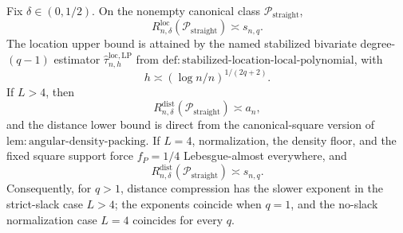 Fix \(\delta\in(0,1/2)\).  On the nonempty canonical class \(\mathcal P_{\mathrm{straight}}\),
\[
 R_{n,\delta}^{\mathrm{loc}}(\mathcal P_{\mathrm{straight}})\asymp s_{n,q}.
\]
The location upper bound is attained by the named stabilized bivariate degree-\((q-1)\) estimator \(\widehat\tau^{\mathrm{loc},\mathrm{LP}}_{n,h}\) from \(\mathrm{def:stabilized\text{-}location\text{-}local\text{-}polynomial}\), with
\[
 h\asymp(\log n/n)^{1/(2q+2)}.
\]
If \(L>4\), then
\[
 R_{n,\delta}^{\mathrm{dist}}(\mathcal P_{\mathrm{straight}})\asymp a_n,
\]
and the distance lower bound is direct from the canonical-square version of \(\mathrm{lem:angular\text{-}density\text{-}packing}\).  If \(L=4\), normalization, the density floor, and the fixed square support force \(f_P=1/4\) Lebesgue-almost everywhere, and
\[
 R_{n,\delta}^{\mathrm{dist}}(\mathcal P_{\mathrm{straight}})\asymp s_{n,q}.
\]
Consequently, for \(q>1\), distance compression has the slower exponent in the strict-slack case \(L>4\); the exponents coincide when \(q=1\), and the no-slack normalization case \(L=4\) coincides for every \(q\).